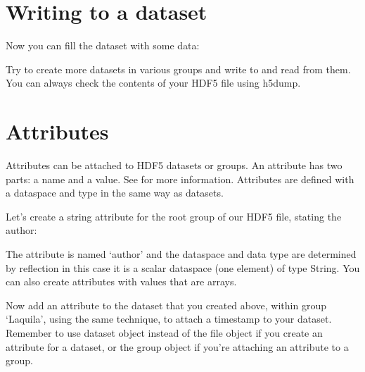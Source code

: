 \documentclass[letterpaper,10pt,english]{sphinxmanual}
\begin{document}
\section{Writing to a dataset}
\label{\detokenize{index:writing-to-a-dataset}}
\sphinxAtStartPar
Now you can fill the dataset with some data:

\begin{sphinxVerbatim}[commandchars=\\\{\}]
\PYG{p}{[}\PYG{p}{]}  
          
\end{sphinxVerbatim}

\sphinxAtStartPar
Try to create more datasets in various groups and write to and read from them. You can always check the contents of your HDF5 file using h5dump.


\section{Attributes}
\label{\detokenize{index:attributes}}
\sphinxAtStartPar
Attributes can be attached to HDF5 datasets or groups. An attribute has two parts: a name and a value. See  for more information. Attributes are defined with a dataspace and type in the same way as datasets.

\sphinxAtStartPar
Let’s create a string attribute for the root group of our HDF5 file, stating the author:

\begin{sphinxVerbatim}[commandchars=\\\{\}]
  
\PYG{p}{[}\PYG{p}{]}  
\end{sphinxVerbatim}

\sphinxAtStartPar
The attribute is named ‘author’ and the dataspace and data type are determined by reflection \sphinxhyphen{} in this case it is a scalar dataspace (one element) of type String.
You can also create attributes with values that are arrays.

\sphinxAtStartPar
Now add an attribute to the dataset that you created above, within group ‘Laquila’, using the same technique, to attach a timestamp to your dataset.
Remember to use dataset object instead of the file object if you create an attribute for a dataset, or the group object if you’re attaching an attribute to a group.
\end{document}
